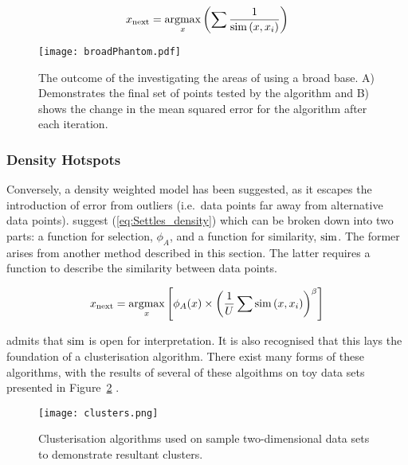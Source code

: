 \begin{equation}
  \label{eq:inverseSim}
  x_\mathrm{next}=\operatorname*{argmax}_x{\left(\sum{\frac{1}{\operatorname*{sim}{(x, x_i)}}}\right)}
\end{equation}
\begin{figure}[H]
  \begin{center}
    \texttt{[image: broadPhantom.pdf]}
    \caption[]{The outcome of the investigating the areas of using a broad base. A) Demonstrates the final set of points tested by the algorithm and B) shows the change in the mean squared error for the algorithm after each iteration.}
    \label{fig:b}
  \end{center}
\end{figure}


\subsubsection{Density Hotspots}
Conversely, a density weighted model has been suggested, as it escapes the introduction of error from outliers (i.e.\ data points far away from alternative data points). \textcite{Set08} suggest (\ref{eq:Settles_density}) which can be broken down into two parts: a function for selection, $\phi_A$, and a function for similarity, $\operatorname*{sim}$. The former arises from  another method described in this section. The latter requires a function to describe the similarity between data points.

\begin{equation}
  \label{eq:Settles_density}
  x_\mathrm{next}=\operatorname*{argmax}_x{\left[\phi_A(x)\times{\left(\frac{1}{U}\sum{\operatorname*{sim}{(x, x_i)}}\right)}^\beta\right]}
\end{equation}

\textcite{Set08} admits that $\operatorname*{sim}$ is open for interpretation. It is also recognised that this lays the foundation of a clusterisation algorithm. There exist many forms of these algorithms, with the results of several of these algoithms on toy data sets presented in Figure~\ref{fig:ClusterResults} \cite{SciClus}.

\begin{figure}[H]
  \begin{center}
    \texttt{[image: clusters.png]}
    \caption[]{Clusterisation algorithms used on sample two-dimensional data sets to demonstrate resultant clusters.}
    \label{fig:ClusterResults}
  \end{center}
\end{figure}

